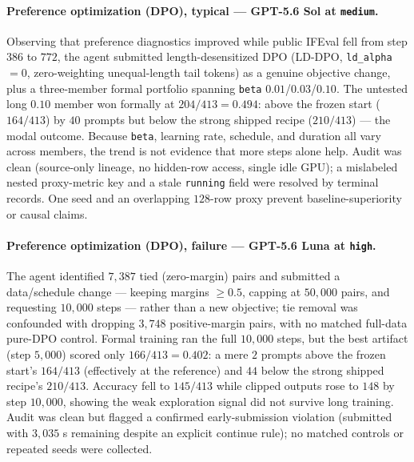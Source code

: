 \paragraph{Preference optimization (DPO), typical --- GPT-5.6 Sol at \texttt{medium}.} Observing that preference diagnostics improved while public IFEval fell from step $386$ to $772$, the agent submitted length-desensitized DPO (LD-DPO, \texttt{ld\_alpha}$=0$, zero-weighting unequal-length tail tokens) as a genuine objective change, plus a three-member formal portfolio spanning \texttt{beta} $0.01$/$0.03$/$0.10$. The untested long $0.10$ member won formally at $204/413=0.494$: above the frozen start ($164/413$) by $40$ prompts but below the strong shipped recipe ($210/413$) --- the modal outcome. Because \texttt{beta}, learning rate, schedule, and duration all vary across members, the trend is not evidence that more steps alone help. Audit was clean (source-only lineage, no hidden-row access, single idle GPU); a mislabeled nested proxy-metric key and a stale \texttt{running} field were resolved by terminal records. One seed and an overlapping $128$-row proxy prevent baseline-superiority or causal claims.

\paragraph{Preference optimization (DPO), failure --- GPT-5.6 Luna at \texttt{high}.} The agent identified $7{,}387$ tied (zero-margin) pairs and submitted a data/schedule change --- keeping margins $\geq 0.5$, capping at $50{,}000$ pairs, and requesting $10{,}000$ steps --- rather than a new objective; tie removal was confounded with dropping $3{,}748$ positive-margin pairs, with no matched full-data pure-DPO control. Formal training ran the full $10{,}000$ steps, but the best artifact (step $5{,}000$) scored only $166/413=0.402$: a mere $2$ prompts above the frozen start's $164/413$ (effectively at the reference) and $44$ below the strong shipped recipe's $210/413$. Accuracy fell to $145/413$ while clipped outputs rose to $148$ by step $10{,}000$, showing the weak exploration signal did not survive long training. Audit was clean but flagged a confirmed early-submission violation (submitted with $3{,}035$ s remaining despite an explicit continue rule); no matched controls or repeated seeds were collected.

